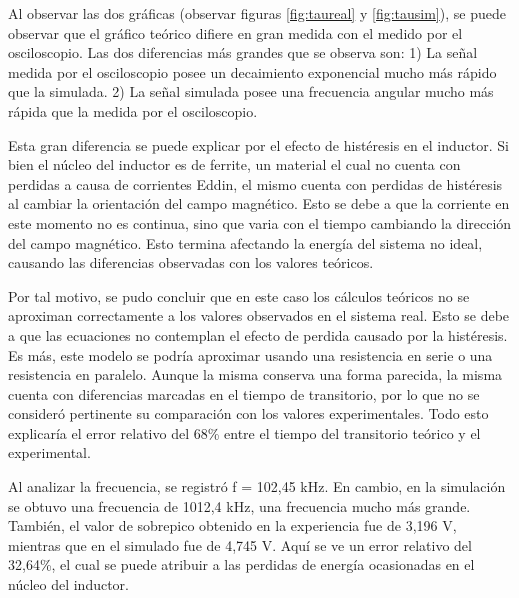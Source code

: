 \documentclass{article}
\begin{document}
   
  Al observar las dos gráficas (observar figuras \ref{fig:taureal} y \ref{fig:tausim}), se puede observar que el gráfico teórico difiere en gran medida con el medido por el osciloscopio. Las dos diferencias más grandes que se observa son: 1) La señal medida por el osciloscopio posee un decaimiento exponencial mucho más rápido que la simulada. 2) La señal simulada posee una frecuencia angular mucho más rápida que la medida por el osciloscopio. \par 
  Esta gran diferencia se puede explicar por el efecto de histéresis en el inductor. Si bien el núcleo del inductor es de ferrite, un material el cual no cuenta con perdidas a causa de corrientes Eddin, el mismo cuenta con perdidas de histéresis al cambiar la orientación del campo magnético. Esto se debe a que la corriente en este momento no es continua, sino que varia con el tiempo cambiando la dirección del campo magnético. Esto termina afectando la energía del sistema no ideal, causando las diferencias observadas con los valores teóricos.\par
  Por tal motivo, se pudo concluir que en este caso los cálculos teóricos no se aproximan correctamente a los valores observados en el sistema real. Esto se debe a que las ecuaciones no contemplan el efecto de perdida causado por la histéresis. Es más, este modelo se podría aproximar usando una resistencia en serie o una resistencia en paralelo. Aunque la misma conserva una forma parecida, la misma cuenta con diferencias marcadas en el tiempo de transitorio, por lo que no se consideró pertinente su comparación con los valores experimentales. Todo esto explicaría el error relativo del 68\% entre el tiempo del transitorio teórico y el experimental.\par
  Al analizar la frecuencia, se registró f = 102,45 kHz. En cambio, en la simulación se obtuvo una frecuencia de 1012,4 kHz, una frecuencia mucho más grande. También, el valor de sobrepico obtenido en la experiencia fue de 3,196 V, mientras que en el simulado fue de 4,745 V. Aquí se ve un error relativo del 32,64\%, el cual se puede atribuir a las perdidas de energía ocasionadas en el núcleo del inductor.
  
\end{document}
